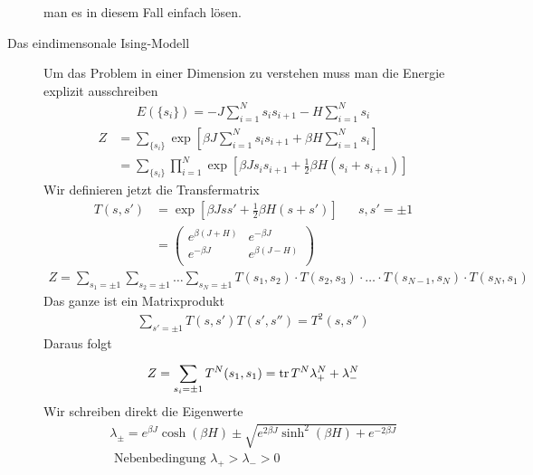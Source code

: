 \begin{description}
    man es in diesem Fall einfach lösen. 
  \item[Das eindimensonale Ising-Modell] Um das Problem in einer Dimension zu verstehen
    muss man die Energie explizit ausschreiben
    \begin{align*}
      E (\{s_i\})  = -J \sum_{i=1}^{N} s_i s_{i+1} -  H \sum_{i=1}^{N} s_i
    \end{align*}
    \begin{align*}
      Z &  = \sum_{\{s_i\}}^{} \exp \left[ \beta J \sum_{i=1}^{N} s_i s_{i+1} + \beta H \sum_{i=1}^{N} s_i \right] \\
        &= \sum_{\{s_i\}}^{} \prod_{i=1}^{N} \exp\left[ \beta J s_i s_{i+1}  + \frac{1}{2} \beta H ( s_i + s_{i+1}) \right]
    \end{align*}
    Wir definieren jetzt die Transfermatrix 
    \begin{align*}
      T(s, s') & = \exp\left[ \beta J s s' + \frac{1}{2}\beta H (s + s') \right] &&
      s, s' = \pm 1 \\
      &  = \begin{pmatrix}
      e^{\beta(J + H)} & e^{- \beta J} \\
      e^{- \beta J} & e^{\beta (J- H)} \\
      \end{pmatrix} 
    \end{align*}
    \begin{align*}
      Z = \sum_{s_1 = \pm 1}^{} \sum_{s_2 = \pm1}^{} \ldots \sum_{s_N = \pm 1}^{}
      T(s_1, s_2) \cdot T(s_2, s_3) \cdot \ldots \cdot T(s_{N-1}, s_N) \cdot 
      T(s_N, s_1)
    \end{align*}
    Das ganze ist ein Matrixprodukt
    \begin{align*}
      \sum_{s' = \pm 1}^{} T(s, s') T(s', s'') = T^2(s, s'')
    \end{align*}
    Daraus folgt
    \begin{align*}
      Z = \sum_{s_i = \pm 1}^{} T^N (s_1, s_1) = \operatorname{tr} T^N \lambda_+^N + \lambda_-^N
    \end{align*}
    Wir schreiben direkt die Eigenwerte
    \begin{align*}
      \lambda_{ \pm} = e^{\beta J} \cosh(\beta H) \pm \sqrt{
        e^{2 \beta J} \sinh^2\left( \beta H \right) + e^{ - 2 \beta J}
      } \\
      \text{ Nebenbedingung } \lambda_+ > \lambda_- > 0 \\
    \end{align*}

\end{description}
